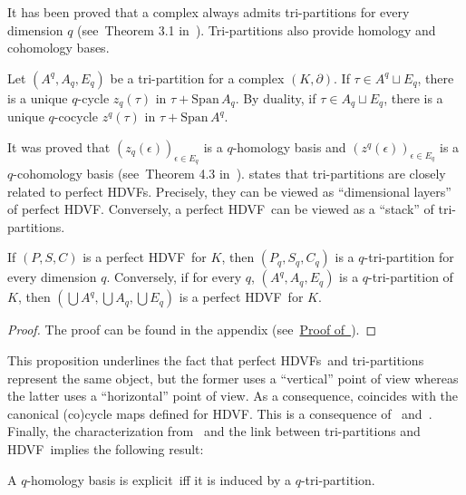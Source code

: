 \documentclass[runningheads]{llncs}
\newcommand{\proofref}[1]{\hyperlink{#1}{Proof of~\Cref{#1}}}
\newcommand\Span{\mathrm{Span}\,}
\newcommand{\dr}{\partial}
\newcommand{\cplx}{{(K,\partial)} }
\newcommand{\explicit}{explicit}
\newcommand{\HC}{HDVF}
\newcommand{\HCs}{HDVFs}
\begin{document}
    It has been proved that a complex always admits tri-partitions for every dimension $q$ (see~Theorem 3.1 in~\cite{edelsbrunner-tri_partition}).
    Tri-partitions also provide homology and cohomology bases.
    \begin{definition}\label{def:tri-partition-canonical-cycle}
        Let $(A^q,A_q,E_q)$ be a tri-partition for a complex $\cplx$.
        If $\tau \in A^q \sqcup E_q$, there is a unique $q$-cycle $z_q(\tau)$ in $\tau+\Span A_q$.
        By duality, if $\tau \in A_q \sqcup E_q$, there is a unique $q$-cocycle $z^q(\tau)$ in $\tau+\Span A^q$.
    \end{definition}
    It was proved that $(z_q(\epsilon) )_{\epsilon \in E_q}$ is a $q$-homology basis and $(z^q(\epsilon))_{\epsilon \in E_q}$ is a $q$-cohomology basis (see~Theorem 4.3 in~\cite{edelsbrunner-tri_partition}).
     states that tri-partitions are closely related to perfect \HCs.
    Precisely, they can be viewed as ``dimensional layers'' of perfect \HC.
    Conversely, a perfect \HC\ can be viewed as a ``stack'' of tri-partitions.
    \begin{proposition}\label{prop_hc-equiv-tri-partition}
        If $(P,S,C)$ is a perfect \HC\ for $K$, then $(P_q, S_q, C_q)$ is a $q$-tri-partition for every dimension $q$.
        Conversely, if for every $q$, $(A^q,A_q,E_q)$ is a $q$-tri-partition of $K$, then $(\bigcup A^q, \bigcup A_q, \bigcup E_q)$ is a perfect \HC\ for $K$.
    \end{proposition}
    \begin{proof}
        The proof can be found in the appendix (see~\proofref{prop_hc-equiv-tri-partition}).
    \end{proof}
    
    This proposition underlines the fact that perfect \HCs\ and tri-partitions represent the same object, but the former uses a ``vertical'' point of view whereas the latter uses a ``horizontal'' point of view.
    As a consequence,  coincides with the canonical (co)cycle maps defined for \HC. This is a consequence of~ and~.
    Finally, the characterization from~ and the link between tri-partitions and \HC\ implies the following result:
    \begin{theorem}\label{thm_charac-bases-from-tri-partition}
        A $q$-homology basis is \explicit\ iff it is induced by a $q$-tri-partition.
    \end{theorem}
\end{document}
